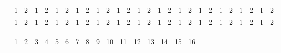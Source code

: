 \documentclass[22pt]{scrartcl}
\begin{document}
\begin{table}
\begin{tabular}{p{5cm}|c|c|c|c|c|c|c|c|c|c|c|c|c|c|c|c|c|c|c|c|c|c|c|c|c|c|}


\cline{2-27}
 & \footnotesize 1 & \footnotesize 2 & \footnotesize 1 & \footnotesize 2 & \footnotesize 1 & \footnotesize 2 & \footnotesize 1 & \footnotesize 2 & \footnotesize 1 & \footnotesize 2 & \footnotesize 1 & \footnotesize 2 & \footnotesize 1 & \footnotesize 2 & \footnotesize 1 & \footnotesize 2 & \footnotesize 1 & \footnotesize 2 & \footnotesize 1 & \footnotesize 2 & \footnotesize 1 & \footnotesize 2 & \footnotesize 1 & \footnotesize 2 & \footnotesize 1 & \footnotesize 2 \\
\cline{1-27} 

\cline{1-27}
 & \footnotesize 1 & \footnotesize 2 & \footnotesize 1 & \footnotesize 2 & \footnotesize 1 & \footnotesize 2 & \footnotesize 1 & \footnotesize 2 & \footnotesize 1 & \footnotesize 2 & \footnotesize 1 & \footnotesize 2 & \footnotesize 1 & \footnotesize 2 & \footnotesize 1 & \footnotesize 2 & \footnotesize 1 & \footnotesize 2 & \footnotesize 1 & \footnotesize 2 & \footnotesize 1 & \footnotesize 2 & \footnotesize 1 & \footnotesize 2 & \footnotesize 1 & \footnotesize 2 \\
\cline{2-27}

\end{tabular}

\begin{tabular}{p{5cm}|c|c|c|c|c|c!{\vrule width 2pt}c|c|c|c|c|c|c|c|c|c!{\vrule width 3pt}p{1cm}!{\vrule width 3pt}}

& 1 & 2 & 3 & 4 & 5 & 6 & 7 & 8 & 9 & 10 & 11 & 12 & 13 & 14 & 15 & 16 & \\
\end{tabular}

\end{table}
\end{document}
